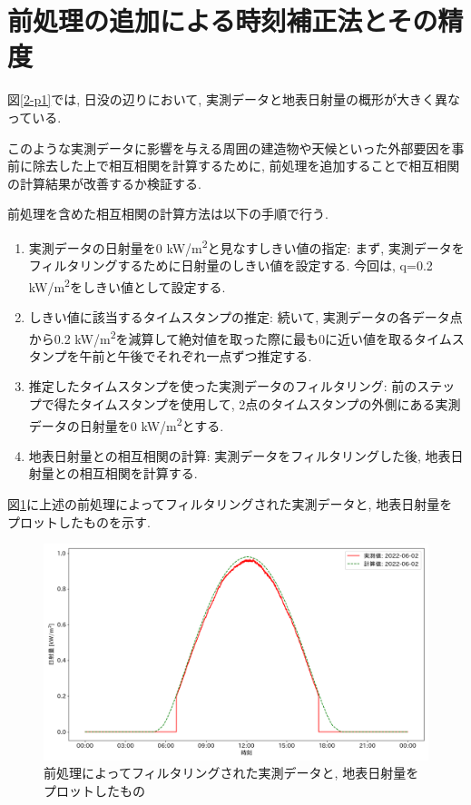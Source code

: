 \section{前処理の追加による時刻補正法とその精度}

図\ref{2-p1}では, 日没の辺りにおいて, 実測データと地表日射量の概形が大きく異なっている.

このような実測データに影響を与える周囲の建造物や天候といった外部要因を事前に除去した上で相互相関を計算するために, 前処理を追加することで相互相関の計算結果が改善するか検証する.

前処理を含めた相互相関の計算方法は以下の手順で行う.

\begin{enumerate}
  \item 実測データの日射量を0 \si{\kilo\watt}/\si{\metre\squared}と見なすしきい値の指定: まず, 実測データをフィルタリングするために日射量のしきい値を設定する. 今回は, q=0.2 \si{\kilo\watt}/\si{\metre\squared}をしきい値として設定する.
  \item しきい値に該当するタイムスタンプの推定: 続いて, 実測データの各データ点から0.2 \si{\kilo\watt}/\si{\metre\squared}を減算して絶対値を取った際に最も0に近い値を取るタイムスタンプを午前と午後でそれぞれ一点ずつ推定する.
  \item 推定したタイムスタンプを使った実測データのフィルタリング: 前のステップで得たタイムスタンプを使用して, 2点のタイムスタンプの外側にある実測データの日射量を0 \si{\kilo\watt}/\si{\metre\squared}とする.
  \item 地表日射量との相互相関の計算: 実測データをフィルタリングした後, 地表日射量との相互相関を計算する.
\end{enumerate}

図\ref{2-p2}に上述の前処理によってフィルタリングされた実測データと, 地表日射量をプロットしたものを示す.

\begin{figure}[h]
  \begin{center}
    \includegraphics[width=160mm]{sotu/figure/2/drop-under-0.2-q.png}
    \caption{前処理によってフィルタリングされた実測データと, 地表日射量をプロットしたもの}
    \label{2-p2}
  \end{center}
\end{figure}

